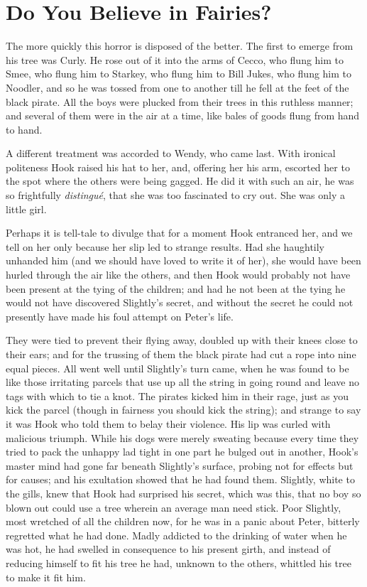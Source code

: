 
\chapter{Do You Believe in Fairies?}

The more quickly this horror is disposed of the better.
The first to emerge from his tree was Curly.
He rose out of it into the arms of Cecco,
who flung him to Smee, who flung him to Starkey, who flung him to Bill Jukes, who flung him to Noodler,
and so he was tossed from one to another till he fell at the feet of the black pirate.
All the boys were plucked from their trees in this ruthless manner;
and several of them were in the air at a time, like bales of goods flung from hand to hand.

A different treatment was accorded to Wendy, who came last.
With ironical politeness Hook raised his hat to her,
and, offering her his arm, escorted her to the spot where the others were being gagged.
He did it with such an air, he was so frightfully \emph{distingué}, that she was too fascinated to cry out.
She was only a little girl.

Perhaps it is tell-tale to divulge that for a moment Hook entranced her,
and we tell on her only because her slip led to strange results.
Had she haughtily unhanded him (and we should have loved to write it of her),
she would have been hurled through the air like the others,
and then Hook would probably not have been present at the tying of the children;
and had he not been at the tying he would not have discovered Slightly's secret,
and without the secret he could not presently have made his foul attempt on Peter's life.

They were tied to prevent their flying away, doubled up with their knees close to their ears;
and for the trussing of them the black pirate had cut a rope into nine equal pieces.
All went well until Slightly's turn came,
when he was found to be like those irritating parcels that use up all the string in going round
and leave no tags with which to tie a knot.
The pirates kicked him in their rage, just as you kick the parcel
(though in fairness you should kick the string);
and strange to say it was Hook who told them to belay their violence.
His lip was curled with malicious triumph.
While his dogs were merely sweating
because every time they tried to pack the unhappy lad tight in one part he bulged out in another,
Hook's master mind had gone far beneath Slightly's surface, probing not for effects but for causes;
and his exultation showed that he had found them.
Slightly, white to the gills, knew that Hook had surprised his secret,
which was this, that no boy so blown out could use a tree wherein an average man need stick.
Poor Slightly, most wretched of all the children now, for he was in a panic about Peter,
bitterly regretted what he had done.
Madly addicted to the drinking of water when he was hot,
he had swelled in consequence to his present girth,
and instead of reducing himself to fit his tree he had,
unknown to the others, whittled his tree to make it fit him.

